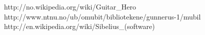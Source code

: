 \documentclass[pdftex,12pt,a4paper]{report}
\begin{document}




\tableofcontents














\begin{thebibliography}{9}
http://no.wikipedia.org/wiki/Guitar\_Hero
http://www.ntnu.no/ub/omubit/bibliotekene/gunnerus-1/mubil
http://en.wikipedia.org/wiki/Sibelius\_(software)
\end{thebibliography}
\end{document}
